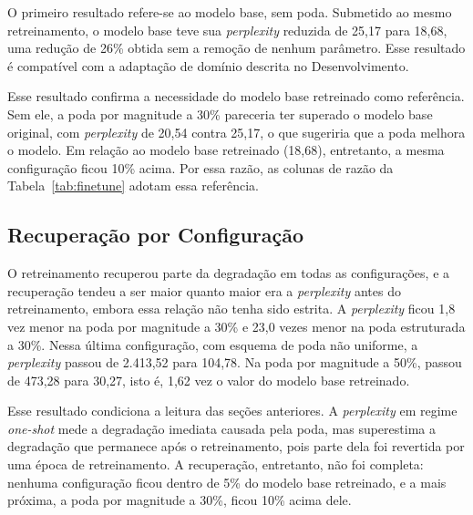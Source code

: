 O primeiro resultado refere-se ao modelo base, sem poda. Submetido ao mesmo retreinamento, o
modelo base teve sua \textit{perplexity} reduzida de 25,17 para 18,68, uma redução de 26\%
obtida sem a remoção de nenhum parâmetro. Esse resultado é compatível com a adaptação de
domínio descrita no Desenvolvimento.

Esse resultado confirma a necessidade do modelo base retreinado como referência. Sem ele, a
poda por magnitude a 30\% pareceria ter superado o modelo base original, com
\textit{perplexity} de 20,54 contra 25,17, o que sugeriria que a poda melhora o modelo. Em
relação ao modelo base retreinado (18,68), entretanto, a mesma configuração ficou 10\% acima.
Por essa razão, as colunas de razão da Tabela~\ref{tab:finetune} adotam essa referência.

\subsection{Recuperação por Configuração}\label{subsec:recuperacao}

O retreinamento recuperou parte da degradação em todas as configurações, e a recuperação tendeu
a ser maior quanto maior era a \textit{perplexity} antes do retreinamento, embora essa relação
não tenha sido estrita. A \textit{perplexity} ficou 1,8 vez menor na poda por magnitude a 30\%
e 23,0 vezes menor na poda estruturada a 30\%. Nessa última configuração, com esquema de poda
não uniforme, a \textit{perplexity} passou de 2.413,52 para 104,78. Na poda por magnitude a
50\%, passou de 473,28 para 30,27, isto é, 1,62 vez o valor do modelo base retreinado.

Esse resultado condiciona a leitura das seções anteriores. A \textit{perplexity} em regime
\textit{one-shot} mede a degradação imediata causada pela poda, mas superestima a degradação
que permanece após o retreinamento, pois parte dela foi revertida por uma época de
retreinamento. A recuperação, entretanto, não foi completa: nenhuma configuração ficou dentro
de 5\% do modelo base retreinado, e a mais próxima, a poda por magnitude a 30\%, ficou 10\%
acima dele.

